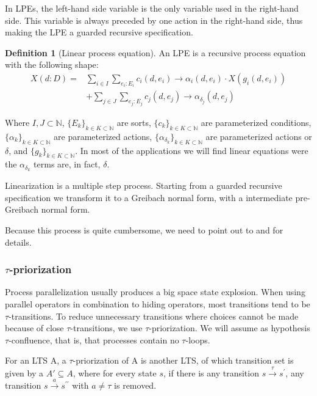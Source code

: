 \documentclass[11pt]{article}
\theoremstyle{definition}
\newtheorem{definition}{Definition}
\theoremstyle{plain}
\begin{document}
In LPEs, the left-hand side variable is the only variable used in the right-hand side. This variable is always preceded by one action in the right-hand side, thus making the LPE a guarded recursive specification.

\begin{definition} [Linear process equation]
	An LPE is a recursive process equation with the following shape:
	\begin{align*}
			X(d:D) = &\sum_{i\in I}\sum_{e_i:E_i} c_i (d,e_i) \rightarrow\alpha_i (d,e_i)\cdot X(g_i(d,e_i)) \\
			& + \sum_{j\in J}\sum_{e_j:E_j} c_j (d,e_j) \rightarrow\alpha_{\delta_j}(d,e_j)
	\end{align*}
	
	Where $ I,J \subset \mathbb{N} $, $ \{E_k\}_{k\in K \subset \mathbb{N}} $ are sorts,  $ \{c_k\}_{k\in K \subset \mathbb{N}} $ are parameterized conditions, $ \{\alpha_k\}_{k\in K \subset \mathbb{N}} $ are parameterized actions, $ \{\alpha_{\delta_k}\}_{k\in K \subset \mathbb{N}} $ are parameterized actions or $ \delta $, and $ \{g_k\}_{k\in K \subset \mathbb{N}} $. In most of the applications we will find linear equations were the $ \alpha_{\delta_k} $ terms are, in fact, $ \delta $.
\end{definition}



Linearization is a multiple step process. Starting from a guarded recursive specification we transform it to a Greibach normal form, with a intermediate pre-Greibach normal form.

Because this process is quite cumbersome, we need to point out to \cite{Groote:2014:MAC:2628007} and \cite{Baeten:1993:DBE:174130.174141} for details.

\subsubsection{$ \tau $-priorization}

Process parallelization usually produces a big space state explosion. When using parallel operators in combination to hiding operators, most transitions tend to be $\tau$-transitions. To reduce unnecessary transitions where choices cannot be made because of close $ \tau $-transitions, we use $ \tau $-priorization. We will assume as hypothesis $ \tau $-confluence, that is, that processes contain no $ \tau $-loops.

For an LTS A, a $ \tau $-priorization of A is another LTS, of which transition set is given by a  $A' \subseteq A$, where for every state $ s $, if there is any transition $ s\xrightarrow{\tau}s^\prime $, any transition $ s\xrightarrow{a}s^{\prime\prime} $ with $a \not = \tau $ is removed.
\end{document}
